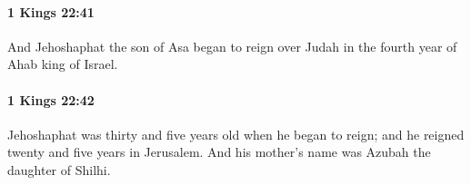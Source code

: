 		\paragraph{1 Kings 22:41} %
			\label{1KINGS-22-41}

			And Jehoshaphat the son of Asa began to reign over Judah in the fourth year of Ahab king of Israel.


		\paragraph{1 Kings 22:42} %
			\label{1KINGS-22-42}

			Jehoshaphat was thirty and five years old when he began to reign; and he reigned twenty and five years in Jerusalem. And his mother’s name was Azubah the daughter of Shilhi.


